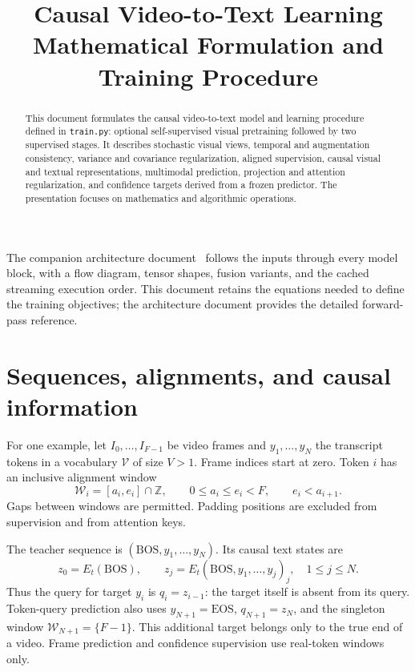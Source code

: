 \documentclass[11pt,a4paper]{article}
\title{Causal Video-to-Text Learning\\
\large Mathematical Formulation and Training Procedure}
\author{}
\date{}
\newcommand{\BOS}{\mathrm{BOS}}
\newcommand{\EOS}{\mathrm{EOS}}
\numberwithin{equation}{section}
\begin{document}
\maketitle
\vspace{-2em}

\begin{abstract}
This document formulates the causal video-to-text model and learning
procedure defined in \texttt{train.py}: optional self-supervised visual
pretraining followed by two supervised stages. It describes stochastic
visual views, temporal and augmentation consistency, variance and covariance
regularization, aligned supervision, causal visual and textual
representations, multimodal prediction, projection and attention
regularization, and confidence targets derived from a frozen predictor.
The presentation focuses on mathematics and algorithmic operations.
\end{abstract}

The companion architecture document~\cite{architecture} follows the inputs
through every model block, with a flow diagram, tensor shapes, fusion
variants, and the cached streaming execution order. This document retains
the equations needed to define the training objectives; the architecture
document provides the detailed forward-pass reference.

\section{Sequences, alignments, and causal information}
\label{sec:alignment}

For one example, let $I_0,\ldots,I_{F-1}$ be video frames and
$y_1,\ldots,y_N$ the transcript tokens in a vocabulary $\mathcal V$ of
size $V>1$. Frame indices start at zero. Token $i$ has an inclusive
alignment window
\begin{equation}
\mathcal W_i=[a_i,e_i]\cap\mathbb Z,
\qquad 0\leq a_i\leq e_i<F,
\qquad e_i<a_{i+1}.
\end{equation}
Gaps between windows are permitted. Padding positions are excluded from
supervision and from attention keys.

The teacher sequence is $(\BOS,y_1,\ldots,y_N)$. Its causal text states are
\begin{equation}
z_0=E_t(\BOS),\qquad
z_j=E_t(\BOS,y_1,\ldots,y_j)_j,\quad 1\leq j\leq N.
\end{equation}
Thus the query for target $y_i$ is $q_i=z_{i-1}$: the target itself is
absent from its query. Token-query prediction also uses
$y_{N+1}=\EOS$, $q_{N+1}=z_N$, and the singleton window
$\mathcal W_{N+1}=\{F-1\}$. This additional target belongs only to the
true end of a video. Frame prediction and confidence supervision use
real-token windows only.
\end{document}
